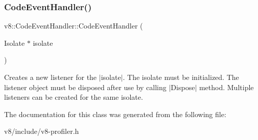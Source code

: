 \subsubsection{\texorpdfstring{Code\+Event\+Handler()}{CodeEventHandler()}}
{\footnotesize\ttfamily v8\+::\+Code\+Event\+Handler\+::\+Code\+Event\+Handler (\begin{DoxyParamCaption}\item[{Isolate $\ast$}]{isolate }\end{DoxyParamCaption})\hspace{0.3cm}{\ttfamily [explicit]}}

Creates a new listener for the $\vert$isolate$\vert$. The isolate must be initialized. The listener object must be disposed after use by calling $\vert$\+Dispose$\vert$ method. Multiple listeners can be created for the same isolate. 

The documentation for this class was generated from the following file\+:\begin{DoxyCompactItemize}
\item 
v8/include/v8-\/profiler.\+h\end{DoxyCompactItemize}
